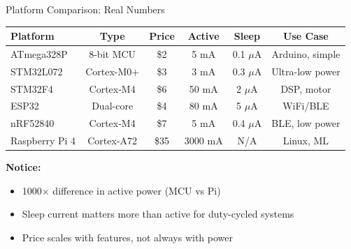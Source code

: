 \documentclass[aspectratio=169,11pt]{beamer}
\begin{document}
\begin{frame}{Platform Comparison: Real Numbers}
    \begin{table}
        \centering
        \footnotesize
        \begin{tabular}{@{}p{2.5cm}ccccc@{}}
            \toprule
            \textbf{Platform} & \textbf{Type} & \textbf{Price} & \textbf{Active} & \textbf{Sleep} & \textbf{Use Case} \\
            \midrule
            ATmega328P & 8-bit MCU & \$2 & 5 mA & 0.1 $\mu$A & Arduino, simple \\
            STM32L072 & Cortex-M0+ & \$3 & 3 mA & 0.3 $\mu$A & Ultra-low power \\
            STM32F4 & Cortex-M4 & \$6 & 50 mA & 2 $\mu$A & DSP, motor \\
            ESP32 & Dual-core & \$4 & 80 mA & 5 $\mu$A & WiFi/BLE \\
            nRF52840 & Cortex-M4 & \$7 & 5 mA & 0.4 $\mu$A & BLE, low power \\
            Raspberry Pi 4 & Cortex-A72 & \$35 & 3000 mA & N/A & Linux, ML \\
            \bottomrule
        \end{tabular}
    \end{table}
    
    \vspace{0.2cm}
    \textbf{Notice:}
    \begin{itemize}
        \item 1000$\times$ difference in active power (MCU vs Pi)
        \item Sleep current matters more than active for duty-cycled systems
        \item Price scales with features, not always with power
    \end{itemize}
\end{frame}
\end{document}
